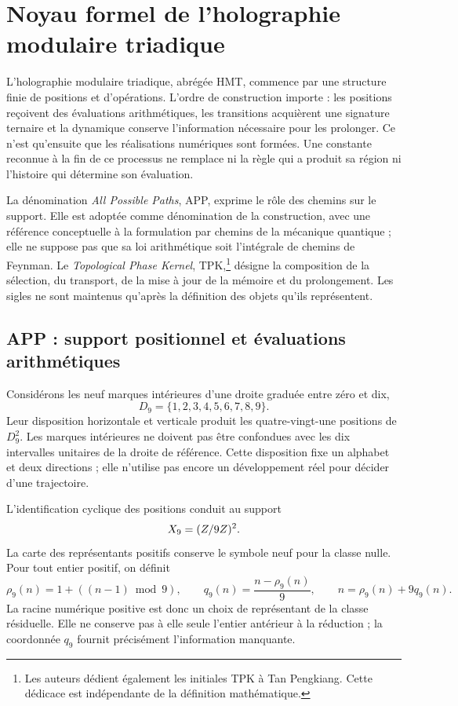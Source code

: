 \section{Noyau formel de l'holographie modulaire triadique}
\label{x_reciprocidad:sec:nucleo}

L'holographie modulaire triadique, abrégée HMT, commence par une structure finie de positions et d'opérations. L'ordre de construction importe : les positions reçoivent des évaluations arithmétiques, les transitions acquièrent une signature ternaire et la dynamique conserve l'information nécessaire pour les prolonger. Ce n'est qu'ensuite que les réalisations numériques sont formées. Une constante reconnue à la fin de ce processus ne remplace ni la règle qui a produit sa région ni l'histoire qui détermine son évaluation.

La dénomination \emph{All Possible Paths}, APP, exprime le rôle des chemins sur le support. Elle est adoptée comme dénomination de la construction, avec une référence conceptuelle à la formulation par chemins de la mécanique quantique ; elle ne suppose pas que sa loi arithmétique soit l'intégrale de chemins de Feynman. Le \emph{Topological Phase Kernel}, TPK,\footnote{Les auteurs dédient également les initiales TPK à Tan Pengkiang. Cette dédicace est indépendante de la définition mathématique.} désigne la composition de la sélection, du transport, de la mise à jour de la mémoire et du prolongement. Les sigles ne sont maintenus qu'après la définition des objets qu'ils représentent.

\subsection{APP : support positionnel et évaluations arithmétiques}

Considérons les neuf marques intérieures d'une droite graduée entre zéro et dix,
\[
 D_9=\{1,2,3,4,5,6,7,8,9\}.
\]
Leur disposition horizontale et verticale produit les quatre-vingt-une positions de \(D_9^2\). Les marques intérieures ne doivent pas être confondues avec les dix intervalles unitaires de la droite de référence. Cette disposition fixe un alphabet et deux directions ; elle n'utilise pas encore un développement réel pour décider d'une trajectoire.

L'identification cyclique des positions conduit au support
\[
 X_9=(Z/9Z)^2.
\]
La carte des représentants positifs conserve le symbole neuf pour la classe nulle. Pour tout entier positif, on définit
\begin{equation}
 \rho_9(n)=1+((n-1)\bmod9),\qquad
 q_9(n)=\frac{n-\rho_9(n)}9,
 \qquad n=\rho_9(n)+9q_9(n).
 \label{x_reciprocidad:eq:residuo-cociente}
\end{equation}
La racine numérique positive est donc un choix de représentant de la classe résiduelle. Elle ne conserve pas à elle seule l'entier antérieur à la réduction ; la coordonnée \(q_9\) fournit précisément l'information manquante.

